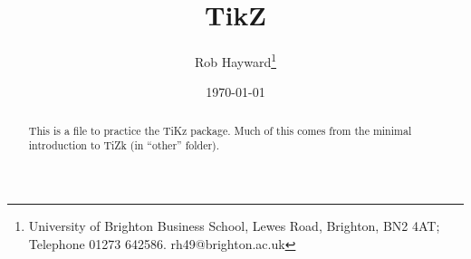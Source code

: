 \documentclass[12pt, a4paper, oneside]{article} %
\begin{document}
\title{TikZ}
\author{Rob Hayward\footnote{University of Brighton Business School, Lewes Road, Brighton, BN2 4AT; Telephone 01273 642586.  rh49@brighton.ac.uk}} 
\date{\today}
\maketitle
\begin{abstract}
This is a file to practice the TiKz package.  Much of this comes from the minimal introduction to TiZk (in ``other'' folder). 
\end{abstract}
\end{document}
